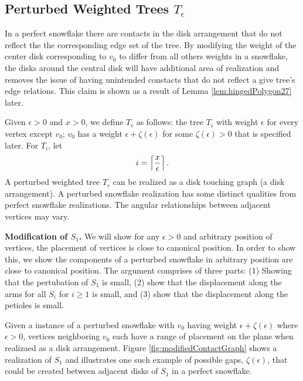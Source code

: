 \subsection{Perturbed Weighted Trees $T_\epsilon$}
In a perfect snowflake there are contacts in the disk arrangement that do not reflect the the corresponding edge set of the tree.  
By modifying the weight of the center disk corresponding to $v_0$ to differ from all others weights in a snowflake, the disks around the central disk will have additional area of realization and removes the issue of having unintended constacts that do not reflect a give tree's edge relations.  
This claim is shown as a result of Lemma \ref{lem:hingedPolygon27} later. 

Given $\epsilon > 0$ and $x >0$, we define $T_\epsilon$ as follows: the tree $T_i$ with weight $\epsilon$ for every vertex except $v_0$; $v_0$ has a weight $\epsilon + \zeta(\epsilon)$ for some $\zeta(\epsilon)>0$ that is specified later.  For $T_i$, let $$i = \left\lceil \frac{x}{\epsilon} \right\rceil .$$ 
A perturbed weighted tree $T_\epsilon$ can be realized as a disk touching graph (a disk arrangement).  
A perturbed snowflake realization has some distinct qualities from perfect snowflake realizations.  
The angular relationships between adjacent vertices may vary.

\textbf{Modification of $S_1$.}
We will show for any $\epsilon >0$ and arbitrary position of vertices, the placement of vertices is close to canonical position.  
In order to show this, we show the components of a perturbed snowflake in arbitrary position  are close to canonical position.  
The argument comprises of three parts: (1) Showing that the pertubation of $S_1$ is small, (2) show that the displacement along the arms for all $S_i$ for $i \geq 1$ is small, and (3) show that the displacement along the petioles is small.  

Given a instance of a perturbed snowflake with $v_0$ having weight $\epsilon + \zeta(\epsilon)$ where $\epsilon > 0$, vertices neighboring $v_0$ each have a range of placement on the plane when realizaed as a disk arrangement. 
Figure \ref{fig:modifiedContactGraph} shows a realization of $S_1$ and illustrates one such example of possible gaps, $\zeta(\epsilon)$, that could be created between adjacent disks of $S_1$ in a perfect snowflake.  
